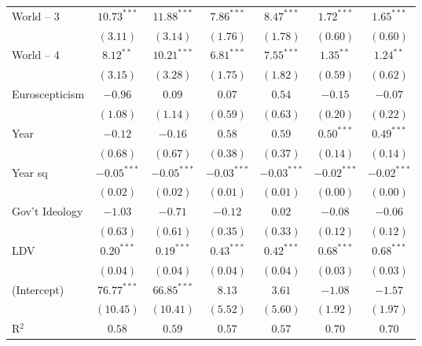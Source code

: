 \begin{table}[htb]
\begin{center}
\begin{tabular}{l c c c c c c}
World -- 3     & $10.73^{***}$  & $11.88^{***}$ & $7.86^{***}$  & $8.47^{***}$  & $1.72^{***}$  & $1.65^{***}$  \\
               & $(3.11)$       & $(3.14)$      & $(1.76)$      & $(1.78)$      & $(0.60)$      & $(0.60)$      \\
World -- 4     & $8.12^{**}$    & $10.21^{***}$ & $6.81^{***}$  & $7.55^{***}$  & $1.35^{**}$   & $1.24^{**}$   \\
               & $(3.15)$       & $(3.28)$      & $(1.75)$      & $(1.82)$      & $(0.59)$      & $(0.62)$      \\
Euroscepticism & $-0.96$        & $0.09$        & $0.07$        & $0.54$        & $-0.15$       & $-0.07$       \\
               & $(1.08)$       & $(1.14)$      & $(0.59)$      & $(0.63)$      & $(0.20)$      & $(0.22)$      \\
Year           & $-0.12$        & $-0.16$       & $0.58$        & $0.59$        & $0.50^{***}$  & $0.49^{***}$  \\
               & $(0.68)$       & $(0.67)$      & $(0.38)$      & $(0.37)$      & $(0.14)$      & $(0.14)$      \\
Year sq        & $-0.05^{***}$  & $-0.05^{***}$ & $-0.03^{***}$ & $-0.03^{***}$ & $-0.02^{***}$ & $-0.02^{***}$ \\
               & $(0.02)$       & $(0.02)$      & $(0.01)$      & $(0.01)$      & $(0.00)$      & $(0.00)$      \\
Gov't Ideology & $-1.03$        & $-0.71$       & $-0.12$       & $0.02$        & $-0.08$       & $-0.06$       \\
               & $(0.63)$       & $(0.61)$      & $(0.35)$      & $(0.33)$      & $(0.12)$      & $(0.12)$      \\
LDV            & $0.20^{***}$   & $0.19^{***}$  & $0.43^{***}$  & $0.42^{***}$  & $0.68^{***}$  & $0.68^{***}$  \\
               & $(0.04)$       & $(0.04)$      & $(0.04)$      & $(0.04)$      & $(0.03)$      & $(0.03)$      \\
(Intercept)    & $76.77^{***}$  & $66.85^{***}$ & $8.13$        & $3.61$        & $-1.08$       & $-1.57$       \\
               & $(10.45)$      & $(10.41)$     & $(5.52)$      & $(5.60)$      & $(1.92)$      & $(1.97)$      \\
\hline
R$^2$          & $0.58$         & $0.59$        & $0.57$        & $0.57$        & $0.70$        & $0.70$        \\

\end{tabular}
\end{center}
\end{table}
